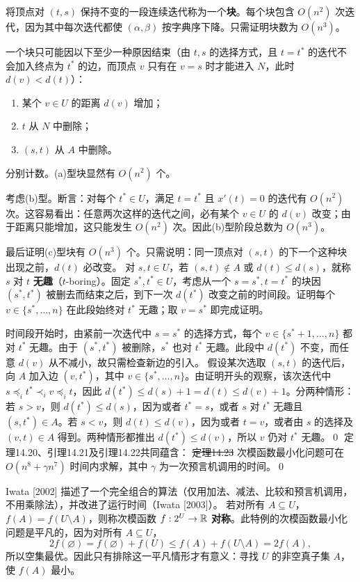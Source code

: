 将顶点对 $(t,s)$ 保持不变的一段连续迭代称为一个\textbf{块}。每个块包含 $O(n^2)$ 次迭代，因为其中每次迭代都使 $(\alpha,\beta)$ 按字典序下降。只需证明块数为 $O(n^3)$。

一个块只可能因以下至少一种原因结束（由 $t,s$ 的选择方式，且 $t=t^*$ 的迭代不会加入终点为 $t^*$ 的边，而顶点 $v$ 只有在 $v=s$ 时才能进入 $N$，此时 $d(v)<d(t)$）：
\begin{enumerate}[label=(\alph*)]
\item 某个 $v\in U$ 的距离 $d(v)$ 增加；
\item $t$ 从 $N$ 中删除；
\item $(s,t)$ 从 $A$ 中删除。
\end{enumerate}
分别计数。(a)型块显然有 $O(n^2)$ 个。

考虑(b)型。断言：对每个 $t^*\in U$，满足 $t=t^*$ 且 $x'(t)=0$ 的迭代有 $O(n^2)$ 次。这容易看出：任意两次这样的迭代之间，必有某个 $v\in U$ 的 $d(v)$ 改变；由于距离只能增加，这只能发生 $O(n^2)$ 次。因此(b)型阶段总数为 $O(n^3)$。

最后证明(c)型块有 $O(n^3)$ 个。只需说明：同一顶点对 $(s,t)$ 的下一个这种块出现之前，$d(t)$ 必改变。
对 $s,t\in U$，若 $(s,t)\notin A$ 或 $d(t)\le d(s)$，就称 $s$ 对 $t$ \textbf{无趣}（$t$-boring）。固定 $s^*,t^*\in U$，考虑从一个 $s=s^*,t=t^*$ 的块因 $(s^*,t^*)$ 被删去而结束之后，到下一次 $d(t^*)$ 改变之前的时间段。证明每个 $v\in\{s^*,\ldots,n\}$ 在此段始终对 $t^*$ 无趣；取 $v=s^*$ 即完成证明。

时间段开始时，由紧前一次迭代中 $s=s^*$ 的选择方式，每个 $v\in\{s^*+1,\ldots,n\}$ 都对 $t^*$ 无趣。由于 $(s^*,t^*)$ 被删除，$s^*$ 也对 $t^*$ 无趣。此段中 $d(t^*)$ 不变，而任意 $d(v)$ 从不减小，故只需检查新边的引入。
假设某次选取 $(s,t)$ 的迭代后，向 $A$ 加入边 $(v,t^*)$，其中 $v\in\{s^*,\ldots,n\}$。由证明开头的观察，该次迭代中 $s\preceq_i t^*\prec_i v\preceq_i t$，因此 $d(t^*)\le d(s)+1=d(t)\le d(v)+1$。分两种情形：若 $s>v$，则 $d(t^*)\le d(s)$，因为或者 $t^*=s$，或者 $s$ 对 $t^*$ 无趣且 $(s,t^*)\in A$。若 $s<v$，则 $d(t)\le d(v)$，因为或者 $t=v$，或者由 $s$ 的选择及 $(v,t)\in A$ 得到。两种情形都推出 $d(t^*)\le d(v)$，所以 $v$ 仍对 $t^*$ 无趣。\qed
定理14.20、引理14.21及引理14.22共同蕴含：
\st{定理14.23} 次模函数最小化问题可在 $O(n^8+\gamma n^7)$ 时间内求解，其中 $\gamma$ 为一次预言机调用的时间。\qed

Iwata [2002] 描述了一个完全组合的算法（仅用加法、减法、比较和预言机调用，不用乘除法），并改进了运行时间（Iwata [2003]）。
若对所有 $A\subseteq U$，$f(A)=f(U\setminus A)$，则称次模函数 $f:2^U\to\mathbb R$ \textbf{对称}。此特例的次模函数最小化问题是平凡的，因为对所有 $A\subseteq U$，
\[2f(\varnothing)=f(\varnothing)+f(U)\le f(A)+f(U\setminus A)=2f(A),\]
所以空集最优。因此只有排除这一平凡情形才有意义：寻找 $U$ 的非空真子集 $A$，使 $f(A)$ 最小。

